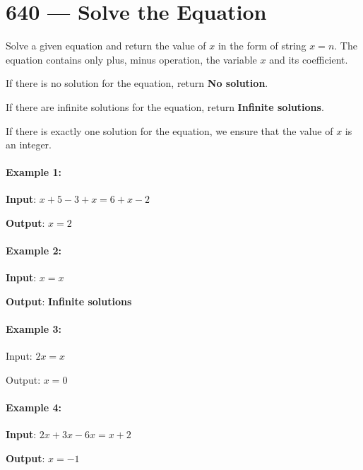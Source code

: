 \section{640 --- Solve the Equation}
Solve a given equation and return the value of $x$ in the form of string $x=n$. The equation contains only plus, minus operation, the variable $x$ and its coefficient.

If there is no solution for the equation, return \textbf{No solution}.

If there are infinite solutions for the equation, return \textbf{Infinite solutions}.

If there is exactly one solution for the equation, we ensure that the value of $x$ is an integer.

\paragraph{Example 1:}

\begin{flushleft}
\textbf{Input}: $x+5-3+x=6+x-2$

\textbf{Output}: $x=2$

\end{flushleft}

\paragraph{Example 2:}

\begin{flushleft}
\textbf{Input}: $x=x$

\textbf{Output}: \textbf{Infinite solutions}

\end{flushleft}

\paragraph{Example 3:}

\begin{flushleft}
Input: $2x=x$

Output: $x=0$

\end{flushleft}

\paragraph{Example 4:}

\begin{flushleft}
\textbf{Input}: $2x+3x-6x=x+2$

\textbf{Output}: $x=-1$

\end{flushleft}

